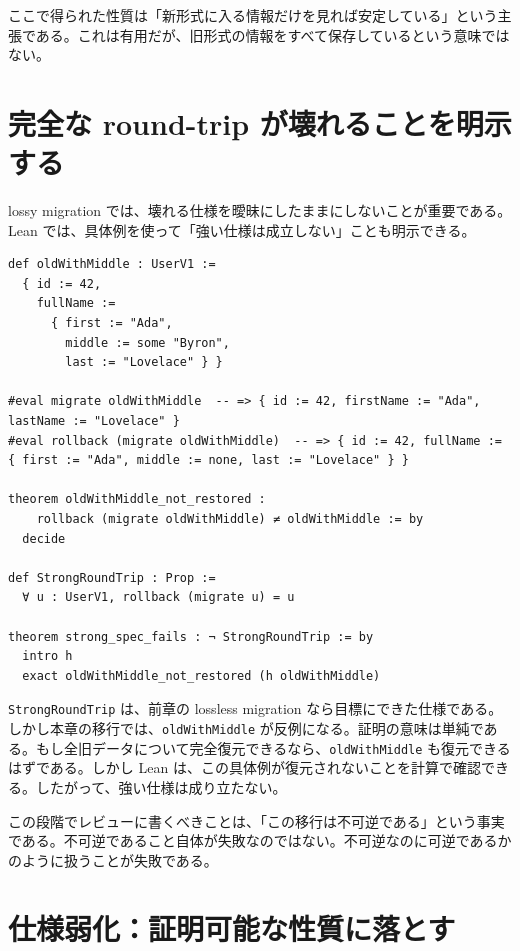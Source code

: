 ここで得られた性質は「新形式に入る情報だけを見れば安定している」という主張である。これは有用だが、旧形式の情報をすべて保存しているという意味ではない。

\section{完全な round-trip が壊れることを明示する}

lossy migration では、壊れる仕様を曖昧にしたままにしないことが重要である。Lean では、具体例を使って「強い仕様は成立しない」ことも明示できる。

\begin{listing}[htbp]
\begin{verbatim}
def oldWithMiddle : UserV1 :=
  { id := 42,
    fullName :=
      { first := "Ada",
        middle := some "Byron",
        last := "Lovelace" } }

#eval migrate oldWithMiddle  -- => { id := 42, firstName := "Ada", lastName := "Lovelace" }
#eval rollback (migrate oldWithMiddle)  -- => { id := 42, fullName := { first := "Ada", middle := none, last := "Lovelace" } }

theorem oldWithMiddle_not_restored :
    rollback (migrate oldWithMiddle) ≠ oldWithMiddle := by
  decide

def StrongRoundTrip : Prop :=
  ∀ u : UserV1, rollback (migrate u) = u

theorem strong_spec_fails : ¬ StrongRoundTrip := by
  intro h
  exact oldWithMiddle_not_restored (h oldWithMiddle)
\end{verbatim}
\caption{ミドルネームを含む旧データでは完全復元できない}
\label{lst:ch23-strong-fails}
\end{listing}

\texttt{StrongRoundTrip} は、前章の lossless migration なら目標にできた仕様である。しかし本章の移行では、\texttt{oldWithMiddle} が反例になる。証明の意味は単純である。もし全旧データについて完全復元できるなら、\texttt{oldWithMiddle} も復元できるはずである。しかし Lean は、この具体例が復元されないことを計算で確認できる。したがって、強い仕様は成り立たない。

\begin{softwarebox}
この段階でレビューに書くべきことは、「この移行は不可逆である」という事実である。不可逆であること自体が失敗なのではない。不可逆なのに可逆であるかのように扱うことが失敗である。
\end{softwarebox}

\section{仕様弱化：証明可能な性質に落とす}

